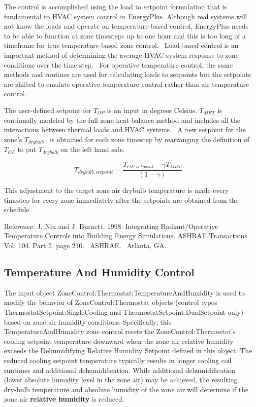The control is accomplished using the load to setpoint formulation that is fundamental to HVAC system control in EnergyPlus. Although real systems will not know the loads and operate on temperature-based control, EnergyPlus needs to be able to function at zone timesteps up to one hour and this is too long of a timeframe for true temperature-based zone control.~ Load-based control is an important method of determining the average HVAC system response to zone conditions over the time step.~ For operative temperature control, the same methods and routines are used for calculating loads to setpoints but the setpoints are shifted to emulate operative temperature control rather than air temperature control.

The user-defined setpoint for \({T_{OP}}\) is an input in degrees Celsius. \({T_{MRT}}\) is continually modeled by the full zone heat balance method and includes all the interactions between thermal loads and HVAC systems.~ A new setpoint for the zone's \({T_{drybulb}}\) ~is obtained for each zone timestep by rearranging the definition of \({T_{OP}}\) to put \({T_{drybulb}}\) on the left hand side.

\begin{equation}
{T_{drybulb,setpoint}} = \frac{{T_{OP,setpoint}} - \gamma {T_{MRT}}}{(1 - \gamma )}
\end{equation}

This adjustment to the target zone air drybulb temperature is made every timestep for every zone immediately after the setpoints are obtained from the schedule.

Reference: J. Niu and J. Burnett. 1998. Integrating Radiant/Operative Temperature Controls into Building Energy Simulations. ASHRAE Transactions Vol. 104. Part 2. page 210.~ ASHRAE.~ Atlanta, GA.

\subsection{Temperature And Humidity Control}\label{temperature-and-humidity-control}

The input object ZoneControl:Thermostat:TemperatureAndHumidity is used to modify the behavior of ZoneControl:Thermostat objects (control types ThermostatSetpoint:SingleCooling and ThermostatSetpoint:DualSetpoint only) based on zone air humidity conditions. Specifically, this TemperatureAndHumidity zone control resets the ZoneControl:Thermostat's cooling setpoint temperature downward when the zone air relative humidity exceeds the Dehumidifying Relative Humidity Setpoint defined in this object. The reduced cooling setpoint temperature typically results in longer cooling coil runtimes and additional dehumidification. While additional dehumidification (lower absolute humidity level in the zone air) may be achieved, the resulting dry-bulb temperature and absolute humidity of the zone air will determine if the zone air \textbf{relative humidity} is reduced.

